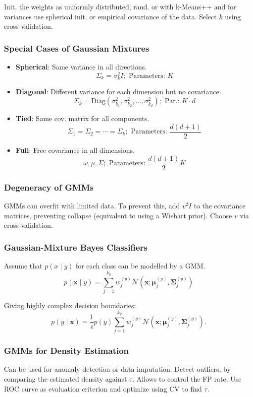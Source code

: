 \documentclass[a4paper,11pt]{article}
\begin{document}
Init. the weights as uniformly distributed, rand. or with k-Means++ and for variances use spherical init. or empirical covariance of the data. Select $k$ using cross-validation. 

\subsubsection*{Special Cases of Gaussian Mixtures}
\begin{itemize}
    \item \textbf{Spherical}: Same variance in all directions. 
    $$\textstyle \Sigma_k = \sigma_k^2 I; \text{ Parameters: } K$$
    \item \textbf{Diagonal}: Different variance for each dimension but no covariance. 
    $$\textstyle \Sigma_k = \text{Diag}(\sigma_{k_1}^2, \sigma_{k_2}^2, \ldots, \sigma_{k_d}^2); \text{ Par.: } K \cdot d$$
    \item \textbf{Tied}: Same cov. matrix for all components. 
    $$\textstyle \Sigma_1 = \Sigma_2 = \cdots = \Sigma_k;\text{ Parameters: } \frac{d(d+1)}{2}$$
    \item \textbf{Full}: Free covariance in all dimensions. 
    $$\textstyle \omega, \mu, \Sigma;\text{ Parameters: } \frac{d(d+1)}{2} K$$
\end{itemize}


\subsubsection*{Degeneracy of GMMs}
GMMs can overfit with limited data. To prevent this, add \( v^2 I \) to the covariance matrices, preventing collapse (equivalent to using a Wishart prior). Choose \( v \) via cross-validation.
\subsubsection*{Gaussian-Mixture Bayes Classifiers} 
Assume that $p(x \mid y)$ for each class can be modelled by a GMM.
$$
\textstyle p(\mathbf{x} \mid  y)=\sum_{j=1}^{k_y} w_j^{(y)} \mathcal{N}(\mathbf{x} ; \boldsymbol{\mu}_j^{(y)}, \boldsymbol{\Sigma}_j^{(y)})
$$

Giving highly complex decision boundaries:
$$
\textstyle p(y \mid \mathbf{x})=\frac{1}{z} p(y) \sum_{j=1}^{k_y} w_j^{(y)} \mathcal{N}(\mathbf{x} ; \boldsymbol{\mu}_j^{(y)}, \boldsymbol{\Sigma}_j^{(y)}).
$$

\subsubsection*{GMMs for Density Estimation}
Can be used for anomaly detection or data imputation. Detect outliers, by comparing the estimated density against $\tau$. Allows to control the FP rate. Use ROC curve as evaluation criterion and optimize using $\mathrm{CV}$ to find $\tau$.
\end{document}
